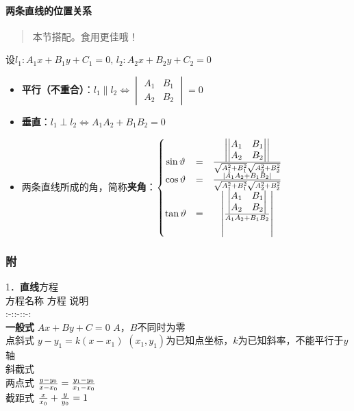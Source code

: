 \documentclass[
]{article}
\begin{document}
\hypertarget{ux4e24ux6761ux76f4ux7ebfux7684ux4f4dux7f6eux5173ux7cfb}{%
\paragraph{两条直线的位置关系}\label{ux4e24ux6761ux76f4ux7ebfux7684ux4f4dux7f6eux5173ux7cfb}}

\begin{quote}
本节搭配。食用更佳哦！
\end{quote}

设\(l_1 : A_1x+ B_1y + C_1 = 0, \, l_2 : A_2x+ B_2y + C_2 = 0\)

\begin{itemize}
\item
  \textbf{平行（不重合）}：\(l_1 \parallel l_2 \Leftrightarrow \begin{vmatrix} A_1 & B_1 \\ A_2 & B_2 \end{vmatrix} = 0\)
\item
  \textbf{垂直}：\(l_1 \perp l_2 \Leftrightarrow A_1A_2 + B_1B_2 = 0\)
\item
  两条直线所成的角，简称\textbf{夹角}：\(
  \left\{\begin{matrix}\sin \vartheta &=& {\left| \begin{vmatrix} A_1 & B_1 \\ A_2 & B_2 \end{vmatrix} \right| \over \sqrt{A_1^2 + B_1^2} \sqrt{A_2^2 + B_2^2}} \\ \cos \vartheta &=& {\left| A_1A_2 + B_1B_2 \right| \over \sqrt{A_1^2 + B_1^2} \sqrt{A_2^2 + B_2^2}} \\ \tan \vartheta &=& \left| {\begin{vmatrix} A_1 & B_1 \\ A_2 & B_2 \end{vmatrix} \over A_1A_2 + B_1B_2} \right| \end{matrix}\right.\)
\end{itemize}

\hypertarget{ux9644}{%
\subsubsection{附}\label{ux9644}}

1．\textbf{直线}方程\\
\textbar{} 方程名称 \textbar{} 方程 \textbar{} 说明 \textbar{}\\
\textbar:-:\textbar:-:\textbar:-:\textbar{}\\
\textbar{} \textbf{一般式} \textbar{} \(Ax + By + C = 0\) \textbar{}
\(A\)，\(B\)不同时为零 \textbar{}\\
\textbar{} 点斜式 \textbar{} \(y-y_1=k(x-x_1)\) \textbar{}
\((x_1,y_1)\)为已知点坐标，\(k\)为已知斜率，不能平行于\(y\)轴
\textbar{}\\
\textbar{} 斜截式 \textbar\textbar\textbar{}\\
\textbar{} 两点式 \textbar{}
\({y - y_0 \over x - x_0} = {y_1 - y_0 \over x_1 - x_0}\) \textbar{}
\textbar{}\\
\textbar{} 截距式 \textbar{} \({x \over x_0} + {y \over y_0} = 1\)
\textbar{} \textbar{}
\end{document}

